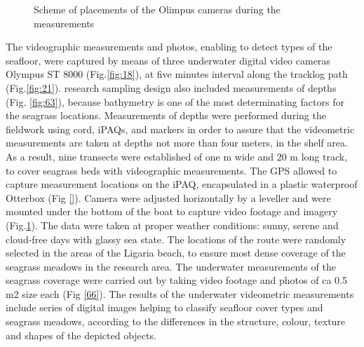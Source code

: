 \documentclass[10pt, a4paper]{article}
\begin{document}
\begin{figure}[h]
	\centering
	\caption{Scheme of placements of the Olimpus cameras during the measurements}
	\label{fig:20}
\end{figure}

The videographic measurements and photos, enabling to detect types of the
seafloor, were captured by means of three underwater digital video cameras Olympus ST 8000 (Fig.\ref{fig:18}), at
five minutes interval along the tracklog path (Fig.\ref{fig:21}).
research sampling design also included measurements of depths (Fig. \ref{fig:63}), because bathymetry is one of the
most determinating factors for the seagrass locations. Measurements of depths were performed during
the fieldwork using cord, iPAQs, and markers in order to assure that the videometric measurements
are taken at depths not more than four meters, in the shelf area.
As a result, nine transects were established of one m wide and 20 m long track, to cover seagrass beds
with videographic measurements. The GPS allowed to capture measurement locations on the iPAQ,
encapsulated in a plastic waterproof Otterbox (Fig \ref{}). Camera were adjusted horizontally by a leveller and
were mounted under the bottom of the boat to capture video footage and imagery (Fig.\ref{fig:20}). The data
were taken at proper weather conditions: sunny, serene and cloud-free days with glassy sea state. The
locations of the route were randomly selected in the areas of the Ligaria beach, to ensure most dense
coverage of the seagrass meadows in the research area. The underwater measurements of the seagrass
coverage were carried out by taking video footage and photos of ca 0.5 m2 size each (Fig \ref{66}).
The results of the underwater videometric measurements include series of digital images helping to
classify seafloor cover types and seagrass meadows, according to the differences in the structure,
colour, texture and shapes of the depicted objects.
\end{document}
